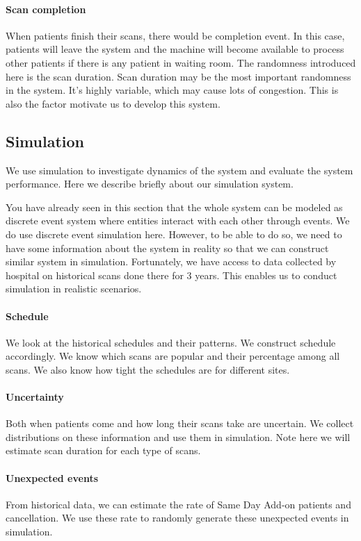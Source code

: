 \paragraph{Scan completion} When patients finish their scans, there would be completion event. In this case, patients will leave the system and the machine will become available to process other patients if there is any patient in waiting room. The randomness introduced here is the scan duration. Scan duration may be the most important randomness in the system. It's highly variable, which may cause lots of congestion. This is also the factor motivate us to develop this system.


\subsection{Simulation}

We use simulation to investigate dynamics of the system and evaluate the system performance. Here we describe briefly about our simulation system.

You have already seen in this section that the whole system can be modeled as discrete event system where entities interact with each other through events. We do use discrete event simulation here. However, to be able to do so, we need to have some information about the system in reality so that we can construct similar system in simulation. Fortunately, we have access to data collected by hospital on historical scans done there for 3 years. This enables us to conduct simulation in realistic scenarios.

\paragraph{Schedule} We look at the historical schedules and their patterns. We construct schedule accordingly. We know which scans are popular and their percentage among all scans. We also know how tight the schedules are for different sites.
\paragraph{Uncertainty} Both when patients come and how long their scans take are uncertain. We collect distributions on these information and use them in simulation. Note here we will estimate scan duration for each type of scans.
\paragraph{Unexpected events} From historical data, we can estimate the rate of Same Day Add-on patients and cancellation. We use these rate to randomly generate these unexpected events in simulation.

